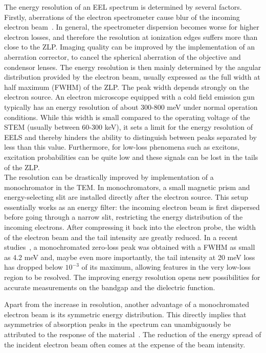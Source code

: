 The energy resolution of an EEL spectrum is determined by several factors. 
%
Firstly, aberrations of the electron spectrometer cause blur of the incoming 
electron beam~\cite{Freitag:2005}. 
%
In general, the spectrometer dispersion becomes worse for higher electron losses,
and therefore the resolution at ionization edges suffers more than close to the
ZLP.
%
Imaging quality can be improved by the implementation of an aberration corrector, 
to cancel the spherical aberration of the objective and condensor lenses. 
%
The energy resolution is then mainly determined by the angular distribution 
provided by the electron beam, usually expressed as the full width at half maximum (FWHM) of the ZLP. 
%
The peak width depends strongly on the electron source. 
An  electron  microscope  equipped  with  a  cold
field emission gun typically has an energy resolution of about 300-800 meV 
under normal operation conditions.  
%
While this width is small compared to the operating voltage of the STEM (usually between 60-300 keV), 
it sets a limit for the energy resolution of EELS and thereby hinders the ability to distinguish 
between peaks separated by less than this value. 
%
Furthermore, for low-loss phenomena such as excitons, 
excitation probabilities can be quite low and these signals can be lost in the tails of the ZLP.\\

The resolution can be drastically improved by implementation of a monochromator 
in the TEM. 
%
In monochromators, a small magnetic prism and energy-selecting slit are installed 
directly after the electron source.
%
This setup essentially works as an energy filter: the incoming electron beam is first dispersed 
before going through a narrow slit, restricting the energy distribution of the incoming electrons. 
%
After compressing it back into the electron probe, the width of the electron beam 
and the tail intensity are greatly reduced.  
%
In a recent studies~\cite{Krivanek:2009}, a monochromated zero-loss peak was obtained 
with a FWHM as small as 4.2 meV and, maybe even more importantly, 
the tail intensity at 20 meV loss has dropped below $10^{-3}$ of its maximum, 
allowing features in the very low-loss region to be resolved. 
%
The improving energy resolution opens new possibilities for accurate measurements
on the bandgap and the 
dielectric function.

Apart from the increase in resolution, another advantage of a monochromated 
electron beam is its symmetric energy distribution. 
%
This directly implies that asymmetries of absorption peaks in the spectrum can 
unambiguously be attributed to the response of the material~\cite{Erni:2005}.
%
The reduction of the energy spread of the incident electron beam often 
comes at the expense of the beam intensity. \\

